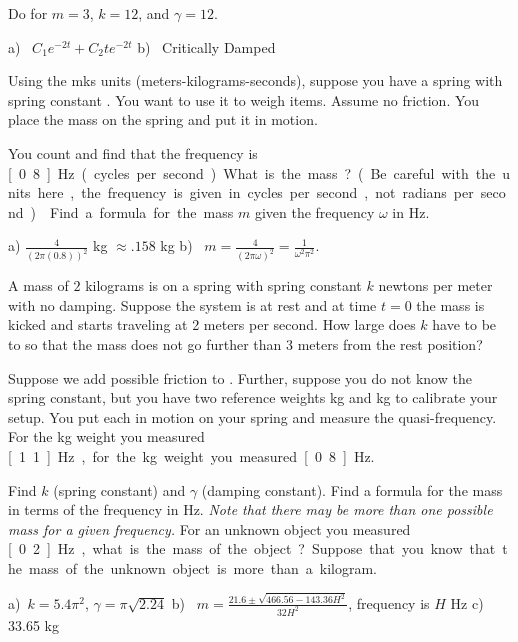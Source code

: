 \begin{exercise}
Do  for
$m=3$, $k=12$, and $\gamma=12$.
\end{exercise}
\comboSol{%
}
{%
a)~ $C_1e^{-2t} + C_2te^{-2t}$ \quad b)~ Critically Damped
}

\begin{exercise} \label{mv:exwt1}
Using the mks units (meters-kilograms-seconds),
suppose you have a spring with spring constant .
You want to use
it to weigh items.  Assume no friction.  You place the mass on
the spring and put it in motion.
\begin{tasks}
\task You count and find that the frequency is
\unit[0.8]{Hz} (cycles per second).  What is the mass? (Be careful with the units here, the frequency is given in cycles per second, not radians per second.)
\task Find a formula for the mass $m$
given the frequency $\omega$ in \unit{Hz}.
\end{tasks}
\end{exercise}
\comboSol{%
}
{%
a) $\frac{4}{(2\pi (0.8))^2}$ kg $\approx .158$ kg \quad b)~ $m = \frac{4}{(2\pi \omega)^2} = \frac{1}{\omega^2 \pi^2}$.
}

\begin{exercise}\ansMark%
A mass of $2$ kilograms is on a spring with spring constant $k$ newtons per
meter with no damping.  Suppose the system is at rest and at time $t=0$ the
mass is kicked and starts traveling at 2 meters per second.  How large
does $k$ have to be to so that the mass does not go further than 3 meters
from the rest position?
\end{exercise}

\begin{exercise}
Suppose we add possible friction to .
Further, suppose you do not know the spring constant, but you have
two reference weights \unit[1]{kg} and \unit[2]{kg} to calibrate your setup.
You put each in motion on your spring and measure the
quasi-frequency.  For the \unit[1]{kg}
weight you measured \unit[1.1]{Hz}, for the \unit[2]{kg} weight you
measured \unit[0.8]{Hz}.
\begin{tasks}
\task Find $k$ (spring constant) and $\gamma$ (damping constant).
\task Find a formula for the mass in terms of the frequency in Hz.  \emph{Note that
there may be more than one possible mass for a given frequency.}
\task For an unknown object you measured \unit[0.2]{Hz}, what is the mass of the
object?  Suppose that you know that the mass of the unknown object
is more than a kilogram.
\end{tasks}
\end{exercise}
\comboSol{%
}
{%
a)~$k =5.4\pi^2$, $\gamma=\pi\sqrt{2.24}$ \quad
b)~ $m = \frac{21.6 \pm \sqrt{466.56 - 143.36H^2}}{32H^2}$, frequency is $H$ Hz \quad
c)~ 33.65 kg
}

